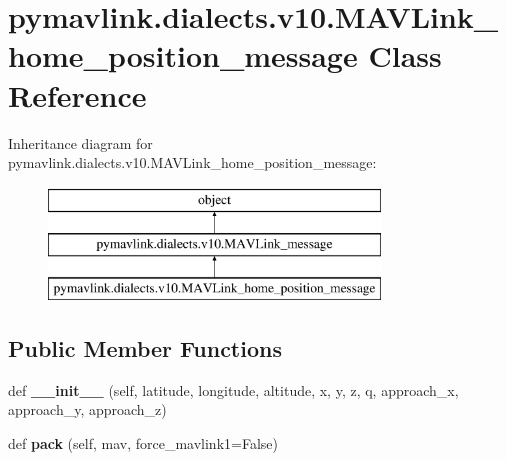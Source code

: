 \hypertarget{classpymavlink_1_1dialects_1_1v10_1_1MAVLink__home__position__message}{}\section{pymavlink.\+dialects.\+v10.\+M\+A\+V\+Link\+\_\+home\+\_\+position\+\_\+message Class Reference}
\label{classpymavlink_1_1dialects_1_1v10_1_1MAVLink__home__position__message}
Inheritance diagram for pymavlink.\+dialects.\+v10.\+M\+A\+V\+Link\+\_\+home\+\_\+position\+\_\+message\+:\begin{figure}[H]
\begin{center}
\leavevmode
\includegraphics[height=3.000000cm]{classpymavlink_1_1dialects_1_1v10_1_1MAVLink__home__position__message}
\end{center}
\end{figure}
\subsection*{Public Member Functions}
\begin{DoxyCompactItemize}
\item 
\mbox{\label{classpymavlink_1_1dialects_1_1v10_1_1MAVLink__home__position__message_a4b0a75fdc468dfba041492ae05ba853b}} 
def {\bfseries \+\_\+\+\_\+init\+\_\+\+\_\+} (self, latitude, longitude, altitude, x, y, z, q, approach\+\_\+x, approach\+\_\+y, approach\+\_\+z)
\item 
\mbox{\label{classpymavlink_1_1dialects_1_1v10_1_1MAVLink__home__position__message_ad899cbe20c43db6c1cbdfa3dc555e339}} 
def {\bfseries pack} (self, mav, force\+\_\+mavlink1=False)
\end{DoxyCompactItemize}
